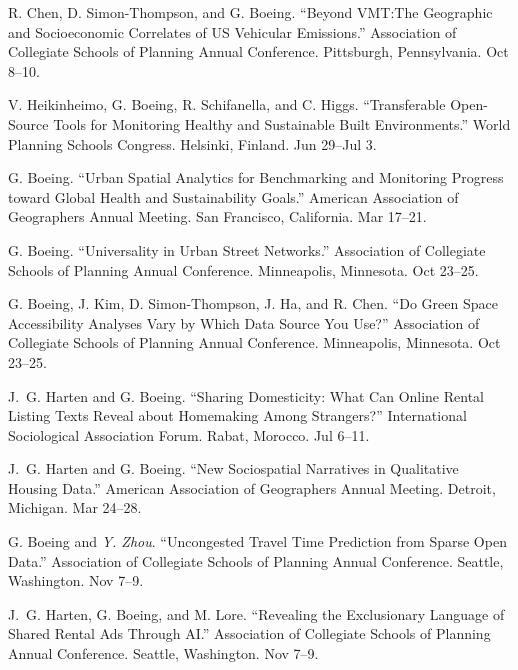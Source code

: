 \documentclass[11pt,a4paper]{report} %
\begin{document}
\begin{tablist}

\item[2026] \tab{}R. Chen, D. Simon-Thompson, and G. Boeing. \enquote{Beyond VMT:\@ The Geographic and Socioeconomic Correlates of US Vehicular Emissions.} Association of Collegiate Schools of Planning Annual Conference. Pittsburgh, Pennsylvania. Oct 8--10.

\item[2026] \tab{}V. Heikinheimo, G. Boeing, R. Schifanella, and C. Higgs. \enquote{Transferable Open-Source Tools for Monitoring Healthy and Sustainable Built Environments.} World Planning Schools Congress. Helsinki, Finland. Jun 29--Jul 3.

\item[2026] \tab{}G. Boeing. \enquote{Urban Spatial Analytics for Benchmarking and Monitoring Progress toward Global Health and Sustainability Goals.} American Association of Geographers Annual Meeting. San Francisco, California. Mar 17--21.

\item[2025] \tab{}G. Boeing. \enquote{Universality in Urban Street Networks.} Association of Collegiate Schools of Planning Annual Conference. Minneapolis, Minnesota. Oct 23--25.

\item[2025] \tab{}G. Boeing, J. Kim, D. Simon-Thompson, J. Ha, and R. Chen. \enquote{Do Green Space Accessibility Analyses Vary by Which Data Source You Use?} Association of Collegiate Schools of Planning Annual Conference. Minneapolis, Minnesota. Oct 23--25.

\item[2025] \tab{}J.~G. Harten and G. Boeing. \enquote{Sharing Domesticity: What Can Online Rental Listing Texts Reveal about Homemaking Among Strangers?} International Sociological Association Forum. Rabat, Morocco. Jul 6--11.

\item[2025] \tab{}J.~G. Harten and G. Boeing. \enquote{New Sociospatial Narratives in Qualitative Housing Data.} American Association of Geographers Annual Meeting. Detroit, Michigan. Mar 24--28.

\item[2024] \tab{}G. Boeing and \textit{Y. Zhou}. \enquote{Uncongested Travel Time Prediction from Sparse Open Data.} Association of Collegiate Schools of Planning Annual Conference. Seattle, Washington. Nov 7--9.

\item[2024] \tab{}J.~G. Harten, G. Boeing, and M. Lore. \enquote{Revealing the Exclusionary Language of Shared Rental Ads Through AI.} Association of Collegiate Schools of Planning Annual Conference. Seattle, Washington. Nov 7--9.


\end{tablist}
\end{document}
